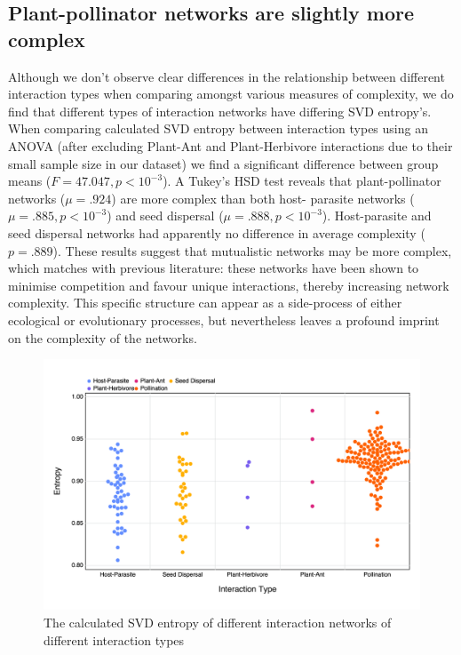 \subsection{Plant-pollinator networks are slightly more
complex}\label{plant-pollinator-networks-are-slightly-more-complex}

Although we don't observe clear differences in the relationship between
different interaction types when comparing amongst various measures of
complexity, we do find that different types of interaction networks have
differing SVD entropy's. When comparing calculated SVD entropy between
interaction types using an ANOVA (after excluding Plant-Ant and Plant-Herbivore
interactions due to their small sample size in our dataset) we find a
significant difference between group means (\(F = 47.047, p < 10^{-3}\)). A
Tukey's HSD test reveals that plant-pollinator networks (\(\mu = .924\)) are
more complex than both host- parasite networks (\(\mu = .885, p < 10^{-3}\)) and
seed dispersal (\(\mu = .888, p < 10^{-3}\)). Host-parasite and seed dispersal
networks had apparently no difference in average complexity (\(p = .889\)).
These results suggest that mutualistic networks may be more complex, which
matches with previous literature: these networks have been shown to minimise
competition \cite{Bastolla2009ArcMut} and favour unique interactions, thereby
increasing network complexity. This specific structure can appear as a
side-process of either ecological \cite{Maynard2018NetSpa} or evolutionary
\cite{Valverde2018ArcMut} processes, but nevertheless leaves a profound imprint
on the complexity of the networks.

\begin{figure}[h]
    \centering
    \includegraphics[width=\textwidth]{figures/interactiontype_v_entropy.png}
    \caption{The calculated SVD entropy of different interaction networks of
different interaction types}
    \label{fig:type}
\end{figure}

